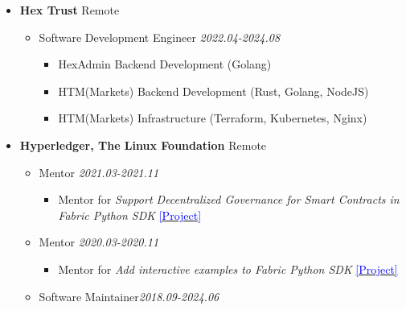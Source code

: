 \documentclass[11pt]{article}
\begin{document}
\begin{itemize}[leftmargin=0em, noitemsep, nolistsep]
\begin{itemize}[noitemsep, nolistsep, leftmargin=0em]
\begin{itemize}
                \item[--] Full-stack R\&D on AIDE: web UI for the aideml app, maintenance of the open-source agent, and research on self-improving agents.
             \end{itemize}
        \end{itemize}
    \item[] \large\textbf{Hex Trust} \hfill Remote
    \begin{itemize}[noitemsep, nolistsep, leftmargin=0em]
        \item[] {Software Development Engineer} \hfill \textit{2022.04-2024.08}
         \begin{itemize}
            \small
            \item[--] HexAdmin Backend Development (Golang)
            \item[--] HTM(Markets) Backend Development (Rust, Golang, NodeJS)
            \item[--] HTM(Markets) Infrastructure (Terraform, Kubernetes, Nginx)
         \end{itemize}
    \end{itemize}
    \item[] \large\textbf{Hyperledger, The Linux Foundation} \hfill Remote
        \begin{itemize}[noitemsep, nolistsep, leftmargin=0em]
            \item[] Mentor \hfill \textit{2021.03-2021.11}
            \begin{itemize}
                \small
                \item[--] Mentor for \textit{Support Decentralized Governance for Smart Contracts in Fabric Python SDK} \href{https://wiki.hyperledger.org/display/INTERN/Support+Decentralized+Governance+for+Smart+Contracts+in+Fabric+Python+SDK}{\textcolor{blue}{[Project]}}
            \end{itemize}
            \item[] Mentor \hfill \textit{2020.03-2020.11}
            \begin{itemize}
                \small
                \item[--] Mentor for \textit{Add interactive examples to Fabric Python SDK} \href{https://wiki.hyperledger.org/pages/viewpage.action?pageId=29035315}{\textcolor{blue}{[Project]}}
            \end{itemize}
            \item[] Software Maintainer\hfill \textit{2018.09-2024.06}
             \begin{itemize}

\end{itemize}
\end{itemize}
\end{itemize}
\end{document}
